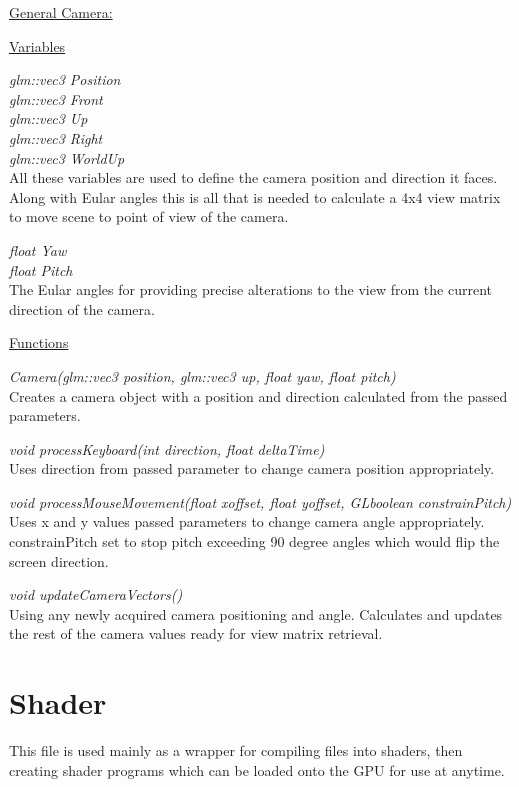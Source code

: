 \documentclass{report}
\begin{document}
\noindent\underline{General Camera:}

\noindent\underline{Variables}

\noindent\textit{glm::vec3 Position}\\
\noindent\textit{glm::vec3 Front}\\
\noindent\textit{glm::vec3 Up}\\
\noindent\textit{glm::vec3 Right}\\
\noindent\textit{glm::vec3 WorldUp}\\
All these variables are used to define the camera position and direction it faces. Along with Eular angles this is all that is needed to calculate
a 4x4 view matrix to move scene to point of view of the camera.

\noindent\textit{float Yaw}\\
\noindent\textit{float Pitch}\\
The Eular angles for providing precise alterations to the view from the current direction of the camera.

\noindent\underline{Functions}

\noindent\textit{Camera(glm::vec3 position, glm::vec3 up, float yaw, float pitch)}\\
Creates a camera object with a position and direction calculated from the passed parameters.

\noindent\textit{void processKeyboard(int direction, float deltaTime)}\\
Uses direction from passed parameter to change camera position appropriately.

\noindent\textit{void processMouseMovement(float xoffset, float yoffset, GLboolean constrainPitch)}\\
Uses x and y values passed parameters to change camera angle appropriately. constrainPitch set to stop 
pitch exceeding 90 degree angles which would flip the screen direction.

\noindent\textit{void updateCameraVectors()}\\
Using any newly acquired camera positioning and angle. Calculates and updates the rest of the camera values ready for view matrix retrieval.

\section{Shader}
This file is used mainly as a wrapper for compiling files into shaders, then creating shader programs which can be loaded onto the GPU for use at anytime.
\end{document}
